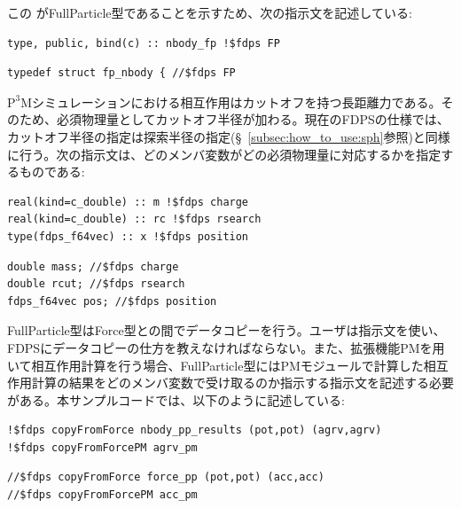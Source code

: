 \ifIF %
この \structure がFullParticle型であることを示すため、次の指示文を記述している:
\endifIF
\ifFtn %
\begin{screen}
\begin{verbatim}
type, public, bind(c) :: nbody_fp !$fdps FP
\end{verbatim}
\end{screen}
\endifFtn
\ifC %
\begin{screen}
\begin{verbatim}
typedef struct fp_nbody { //$fdps FP
\end{verbatim}
\end{screen}
\endifC
\ifIF %
$\mathrm{P^{3}M}$シミュレーションにおける相互作用はカットオフを持つ長距離力である。そのため、必須物理量としてカットオフ半径が加わる。現在のFDPSの仕様では、カットオフ半径の指定は探索半径の指定(\S~\ref{subsec:how_to_use:sph}参照)と同様に行う。次の指示文は、どのメンバ変数がどの必須物理量に対応するかを指定するものである:
\endifIF
\ifFtn %
\begin{screen}
\begin{verbatim}
real(kind=c_double) :: m !$fdps charge
real(kind=c_double) :: rc !$fdps rsearch
type(fdps_f64vec) :: x !$fdps position
\end{verbatim}
\end{screen}
\endifFtn
\ifC %
\begin{screen}
\begin{verbatim}
double mass; //$fdps charge
double rcut; //$fdps rsearch     
fdps_f64vec pos; //$fdps position
\end{verbatim}
\end{screen}
\endifC
\ifIF %
FullParticle型はForce型との間でデータコピーを行う。ユーザは指示文を使い、FDPSにデータコピーの仕方を教えなければならない。また、拡張機能PMを用いて相互作用計算を行う場合、FullParticle型にはPMモジュールで計算した相互作用計算の結果をどのメンバ変数で受け取るのか指示する指示文を記述する必要がある。本サンプルコードでは、以下のように記述している:
\endifIF
\ifFtn %
\begin{screen}
\begin{verbatim}
!$fdps copyFromForce nbody_pp_results (pot,pot) (agrv,agrv)
!$fdps copyFromForcePM agrv_pm
\end{verbatim}
\end{screen}
\endifFtn
\ifC %
\begin{screen}
\begin{verbatim}
//$fdps copyFromForce force_pp (pot,pot) (acc,acc)  
//$fdps copyFromForcePM acc_pm                      
\end{verbatim}
\end{screen}
\endifC

